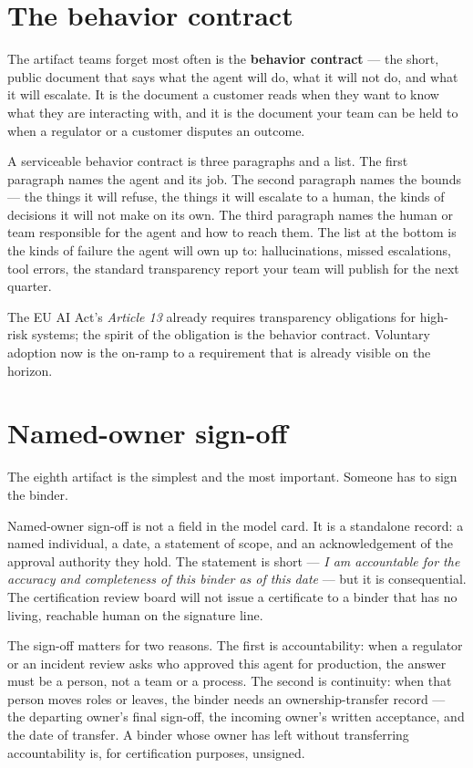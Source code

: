 \section{The behavior contract}

The artifact teams forget most often is the \textbf{behavior contract} --- the short, public document that says what the agent will do, what it will not do, and what it will escalate. It is the document a customer reads when they want to know what they are interacting with, and it is the document your team can be held to when a regulator or a customer disputes an outcome.

A serviceable behavior contract is three paragraphs and a list. The first paragraph names the agent and its job. The second paragraph names the bounds --- the things it will refuse, the things it will escalate to a human, the kinds of decisions it will not make on its own. The third paragraph names the human or team responsible for the agent and how to reach them. The list at the bottom is the kinds of failure the agent will own up to: hallucinations, missed escalations, tool errors, the standard transparency report your team will publish for the next quarter.

The EU AI Act's \textit{Article 13} already requires transparency obligations for high-risk systems; the spirit of the obligation is the behavior contract. Voluntary adoption now is the on-ramp to a requirement that is already visible on the horizon.

\section{Named-owner sign-off}

The eighth artifact is the simplest and the most important. Someone has to sign the binder.

Named-owner sign-off is not a field in the model card. It is a standalone record: a named individual, a date, a statement of scope, and an acknowledgement of the approval authority they hold. The statement is short --- \textit{I am accountable for the accuracy and completeness of this binder as of this date} --- but it is consequential. The certification review board will not issue a certificate to a binder that has no living, reachable human on the signature line.

The sign-off matters for two reasons. The first is accountability: when a regulator or an incident review asks who approved this agent for production, the answer must be a person, not a team or a process. The second is continuity: when that person moves roles or leaves, the binder needs an ownership-transfer record --- the departing owner's final sign-off, the incoming owner's written acceptance, and the date of transfer. A binder whose owner has left without transferring accountability is, for certification purposes, unsigned.

